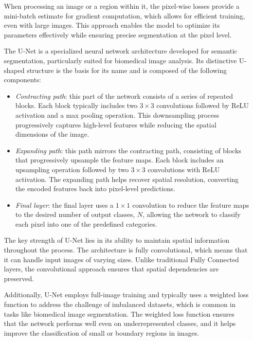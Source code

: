 When processing an image or a region within it, the pixel-wise losses provide a mini-batch estimate for gradient computation, which allows for efficient training, even with large images. 
This approach enables the model to optimize its parameters effectively while ensuring precise segmentation at the pixel level.

The U-Net is a specialized neural network architecture developed for semantic segmentation, particularly suited for biomedical image analysis. 
Its distinctive U-shaped structure is the basis for its name and is composed of the following components:
\begin{itemize} 
    \item \textit{Contracting path}: this part of the network consists of a series of repeated blocks.
        Each block typically includes two $3 \times 3$ convolutions followed by ReLU activation and a max pooling operation. 
        This downsampling process progressively captures high-level features while reducing the spatial dimensions of the image. 
    \item \textit{Expanding path}: this path mirrors the contracting path, consisting of blocks that progressively upsample the feature maps. 
        Each block includes an upsampling operation followed by two $3 \times 3$ convolutions with ReLU activation.
        The expanding path helps recover spatial resolution, converting the encoded features back into pixel-level predictions. 
    \item \textit{Final layer}: the final layer uses a $1 \times 1$ convolution to reduce the feature maps to the desired number of output classes, $N$, allowing the network to classify each pixel into one of the predefined categories. 
\end{itemize}
The key strength of U-Net lies in its ability to maintain spatial information throughout the process. 
The architecture is fully convolutional, which means that it can handle input images of varying sizes. 
Unlike traditional Fully Connected layers, the convolutional approach ensures that spatial dependencies are preserved.

Additionally, U-Net employs full-image training and typically uses a weighted loss function to address the challenge of imbalanced datasets, which is common in tasks like biomedical image segmentation. 
The weighted loss function ensures that the network performs well even on underrepresented classes, and it helps improve the classification of small or boundary regions in images.

